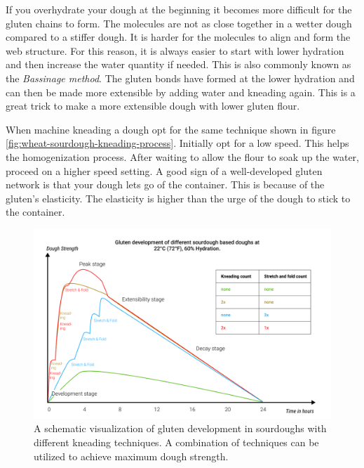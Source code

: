 If you overhydrate your dough at the beginning it becomes more difficult
for the gluten chains to form. The molecules are not as close together in
a wetter dough compared to a stiffer dough. It is harder for the molecules
to align and form the web structure. For this reason, it is always easier
to start with lower hydration and then increase the water quantity if needed.
This is also commonly known as the \textit{Bassinage method}. The gluten
bonds have formed at the lower hydration and can then be made more extensible
by adding water and kneading again. This is a great trick to make
a more extensible dough with lower gluten flour. \cite{bassinage+technique}

When machine kneading a dough opt for the same technique shown in figure \ref*{fig:wheat-sourdough-kneading-process}.
Initially opt for a low speed. This helps the homogenization process.
After waiting to allow the flour to soak up the water, proceed on a higher speed
setting. A good sign of a well-developed gluten network is
that your dough lets go of the container. This is because of the gluten's elasticity.
The elasticity is higher than the urge of the
dough to stick to the container.

\begin{figure}[!htb]
  \includegraphics[width=\textwidth]{dough-strength-sourdough}
  \caption{A schematic visualization of
  gluten development in sourdoughs with different kneading techniques.
  A combination of techniques can be utilized to achieve maximum
  dough strength.
  }
  \label{fig:dough-strength-sourdough}
\end{figure}

